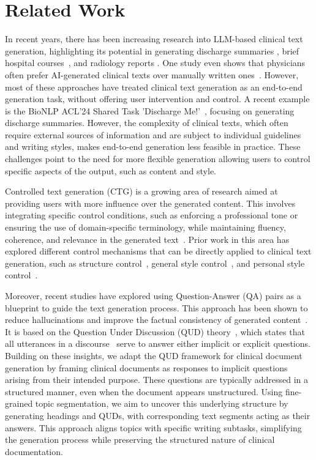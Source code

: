\section{Related Work}
In recent years, there has been increasing research into LLM-based clinical text generation, highlighting its potential in generating discharge summaries \citep{ando2022artificial, ellershaw2024automated, clough2024transforming, dubinski2024leveraging}, brief hospital courses~\citep{hartman2022day, hartman2023method, searle2023discharge}, and radiology reports \citep{alfarghaly2021automated, wang2023r2gengpt, yang2023radiology}. One study even shows that physicians often prefer AI-generated clinical texts over manually written ones~\citep{van2024adapted}. However, most of these approaches have treated clinical text generation as an end-to-end generation task, without offering user intervention and control. A recent example is the BioNLP ACL'24 Shared Task 'Discharge Me!'~\citep{xu-etal-2024-overview}, focusing on generating discharge summaries. However, the complexity of clinical texts, which often require external sources of information and are subject to individual guidelines and writing styles, makes end-to-end generation less feasible in practice. These challenges point to the need for more flexible generation allowing users to control specific aspects of the output, such as content and style.

Controlled text generation (CTG) is a growing area of research aimed at providing users with more influence over the generated content. This involves integrating specific control conditions, such as enforcing a professional tone or ensuring the use of domain-specific terminology, while maintaining fluency, coherence, and relevance in the generated text~\citep{zhang2023survey}. Prior work in this area has explored different control mechanisms that can be directly applied to clinical text generation, such as structure control~\citep{yang-klein-2021-fudge, zou2021controllable}, general style control~\citep{keskar2019ctrl}, and personal style control~\citep{tao2024cat}.

Moreover, recent studies have explored using Question-Answer (QA) pairs as a blueprint to guide the text generation process. This approach has been shown to reduce hallucinations and improve the factual consistency of generated content~\citep{narayan-etal-2023-conditional, huot-etal-2023-text}. It is based on the Question Under Discussion (QUD) theory~\citep{roberts:2012:information}, which states that all utterances in a discourse~\citep{van1995discourse} serve to answer either implicit or explicit questions. Building on these insights, we adapt the QUD framework for clinical document generation by framing clinical documents as responses to implicit questions arising from their intended purpose. These questions are typically addressed in a structured manner, even when the document appears unstructured. Using fine-grained topic segmentation, we aim to uncover this underlying structure by generating headings and QUDs, with corresponding text segments acting as their answers. This approach aligns topics with specific writing subtasks, simplifying the generation process while preserving the structured nature of clinical documentation.